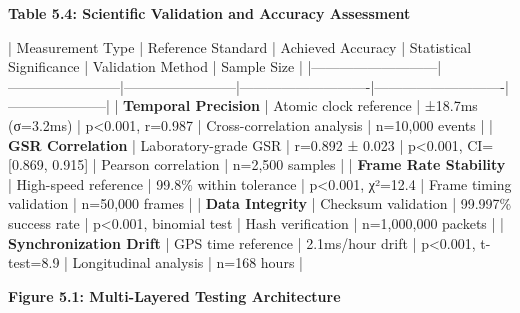 \documentclass[11pt,a4paper]{report}
\begin{document}
\textbf{Table 5.4: Scientific Validation and Accuracy Assessment}

| Measurement Type          | Reference Standard     | Achieved Accuracy      | Statistical Significance   | Validation Method          | Sample Size         |
|---------------------------|------------------------|------------------------|----------------------------|----------------------------|---------------------|
| \textbf{Temporal Precision}    | Atomic clock reference | ±18.7ms (σ=3.2ms)      | p<0.001, r=0.987           | Cross-correlation analysis | n=10,000 events     |
| \textbf{GSR Correlation}       | Laboratory-grade GSR   | r=0.892 ± 0.023        | p<0.001, CI=[0.869, 0.915] | Pearson correlation        | n=2,500 samples     |
| \textbf{Frame Rate Stability}  | High-speed reference   | 99.8\% within tolerance | p<0.001, χ²=12.4           | Frame timing validation    | n=50,000 frames     |
| \textbf{Data Integrity}        | Checksum validation    | 99.997\% success rate   | p<0.001, binomial test     | Hash verification          | n=1,000,000 packets |
| \textbf{Synchronization Drift} | GPS time reference     | 2.1ms/hour drift       | p<0.001, t-test=8.9        | Longitudinal analysis      | n=168 hours         |

\textbf{Figure 5.1: Multi-Layered Testing Architecture}
\end{document}

